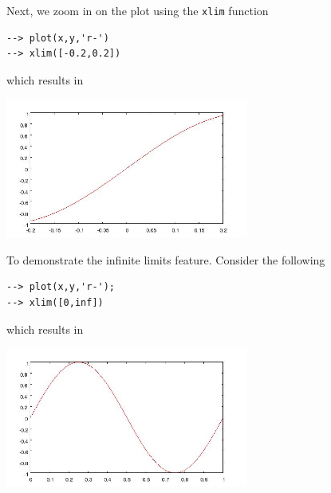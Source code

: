 Next, we zoom in on the plot using the \verb|xlim| function
\begin{verbatim}
--> plot(x,y,'r-')
--> xlim([-0.2,0.2])
\end{verbatim}
which results in


\centerline{\includegraphics[width=8cm]{xlim2}}

To demonstrate the infinite limits feature.  Consider the following
\begin{verbatim}
--> plot(x,y,'r-');
--> xlim([0,inf])
\end{verbatim}
which results in 


\centerline{\includegraphics[width=8cm]{xlim3}}

